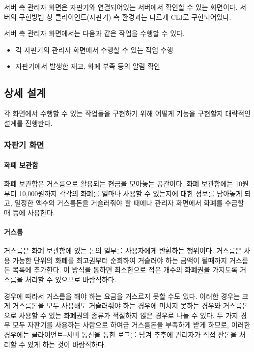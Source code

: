 \documentclass{oblivoir}
\begin{document}
    서버 측 관리자 화면은 자판기와 연결되어있는
    서버에서 확인할 수 있는 화면이다.
    서버의 구현방법 상 클라이언트(자판기) 측 환경과는 다르게
    CLI로 구현되어있다.

    서버 측 관리자 화면에서는 다음과 같은 작업을 수행할 수 있다.

    \begin{itemize}
        \item 각 자판기의 관리자 화면에서 수행할 수 있는 작업 수행
        \item 자판기에서 발생한 재고, 화폐 부족 등의 알림 확인
    \end{itemize}

    \subsection{상세 설계}

    각 화면에서 수행할 수 있는 작업들을 구현하기 위해
    어떻게 기능을 구현할지 대략적인 설계를 진행한다.

    \subsubsection{자판기 화면}

    \paragraph{화폐 보관함}

    화폐 보관함은 거스름으로 활용되는 현금을 모아놓는 공간이다.
    화폐 보관함에는 10원부터 10,000원까지 각각의 화폐를
    얼마나 사용할 수 있는지에 대한 정보를 담아놓게 되고,
    일정한 액수의 거스름돈을 거슬러줘야 할 때에나
    관리자 화면에서 화폐를 수금할 때 등에 사용한다.

    \paragraph{거스름}

    거스름은 화폐 보관함에 있는 돈의 일부를 사용자에게 반환하는 행위이다.
    거스름은 사용 가능한 단위의 화폐를 최고권부터 순회하여 거슬러야 하는
    금액이 될때까지 거스름돈 목록에 추가한다.
    이 방식을 통하면 최소한으로 적은 개수의 화폐권을 가지도록
    거스름을 처리할 수 있으므로 바람직하다.

    경우에 따라서 거스름을 해야 하는 요금을 거스르지 못할 수도 있다.
    이러한 경우는 크게 거스름돈을 모두 사용해도 거슬러줘야 하는 경우에
    미치지 못하는 경우와 거스름돈으로 사용할 수 있는 화폐권의 종류가
    적절하지 않은 경우로 나눌 수 있다.
    두 가지 경우 모두 자판기를 사용하는 사람으로 하여금 거스름돈을
    부족하게 받게 하므로,
    이러한 경우에는 클라이언트–서버 통신을 통한 로그를 남겨 %
    추후에 관리자가 직접 잔돈을 처리할 수 있게 하는 것이 바람직하다.
\end{document}

